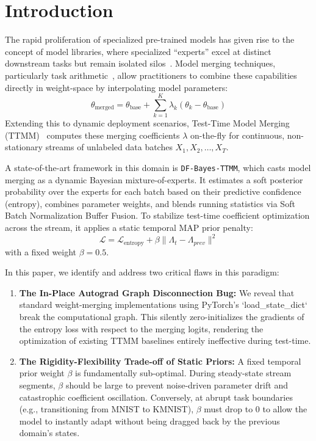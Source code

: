 \documentclass{article}
\begin{document}
\section{Introduction}
\label{sec:intro}
The rapid proliferation of specialized pre-trained models has given rise to the concept of model libraries, where specialized ``experts'' excel at distinct downstream tasks but remain isolated silos~\cite{wortsman2022model}. Model merging techniques, particularly task arithmetic~\cite{ilharco2023editing}, allow practitioners to combine these capabilities directly in weight-space by interpolating model parameters:
\begin{equation}
    \theta_{\text{merged}} = \theta_{\text{base}} + \sum_{k=1}^K \lambda_k (\theta_k - \theta_{\text{base}})
\end{equation}
Extending this to dynamic deployment scenarios, Test-Time Model Merging (TTMM)~\cite{yang2024test} computes these merging coefficients $\lambda$ on-the-fly for continuous, non-stationary streams of unlabeled data batches $X_1, X_2, \dots, X_T$.

A state-of-the-art framework in this domain is \texttt{DF-Bayes-TTMM}, which casts model merging as a dynamic Bayesian mixture-of-experts. It estimates a soft posterior probability over the experts for each batch based on their predictive confidence (entropy), combines parameter weights, and blends running statistics via Soft Batch Normalization Buffer Fusion. To stabilize test-time coefficient optimization across the stream, it applies a static temporal MAP prior penalty:
\begin{equation}
    \mathcal{L} = \mathcal{L}_{\text{entropy}} + \beta \|\Lambda_t - \Lambda_{prev}\|^2
\end{equation}
with a fixed weight $\beta = 0.5$.

In this paper, we identify and address two critical flaws in this paradigm:
\begin{enumerate}
    \item \textbf{The In-Place Autograd Graph Disconnection Bug:} We reveal that standard weight-merging implementations using PyTorch's `load_state_dict` break the computational graph. This silently zero-initializes the gradients of the entropy loss with respect to the merging logits, rendering the optimization of existing TTMM baselines entirely ineffective during test-time.
    \item \textbf{The Rigidity-Flexibility Trade-off of Static Priors:} A fixed temporal prior weight $\beta$ is fundamentally sub-optimal. During steady-state stream segments, $\beta$ should be large to prevent noise-driven parameter drift and catastrophic coefficient oscillation. Conversely, at abrupt task boundaries (e.g., transitioning from MNIST to KMNIST), $\beta$ must drop to $0$ to allow the model to instantly adapt without being dragged back by the previous domain's states.
\end{enumerate}
\end{document}

